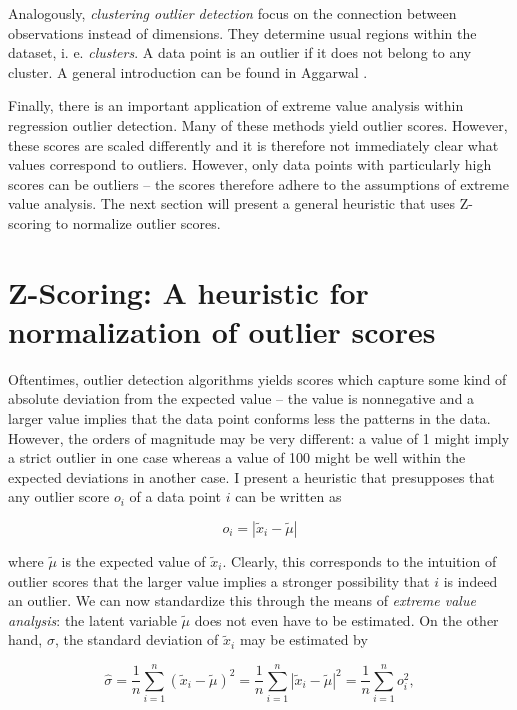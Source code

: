 \documentclass[]{report}
\theoremstyle{definition}
\theoremstyle{definition}
\theoremstyle{definition}
\theoremstyle{remark}
\begin{document}
Analogously, \emph{clustering outlier detection} focus on the connection
between observations instead of dimensions. They determine usual regions
within the dataset, i. e. \emph{clusters}. A data point is an outlier if
it does not belong to any cluster. A general introduction can be found
in Aggarwal \citeyearpar[ch.~4]{Aggarwal2017}.

Finally, there is an important application of extreme value analysis
within regression outlier detection. Many of these methods yield outlier
scores. However, these scores are scaled differently and it is therefore
not immediately clear what values correspond to outliers. However, only
data points with particularly high scores can be outliers -- the scores
therefore adhere to the assumptions of extreme value analysis. The next
section will present a general heuristic that uses Z-scoring to
normalize outlier scores.

\hypertarget{z-scoring-a-heuristic-for-normalization-of-outlier-scores}{%
\section{Z-Scoring: A heuristic for normalization of outlier
scores}\label{z-scoring-a-heuristic-for-normalization-of-outlier-scores}}

Oftentimes, outlier detection algorithms yields scores which capture
some kind of absolute deviation from the expected value -- the value is
nonnegative and a larger value implies that the data point conforms less
the patterns in the data. However, the orders of magnitude may be very
different: a value of 1 might imply a strict outlier in one case whereas
a value of 100 might be well within the expected deviations in another
case. I present a heuristic that presupposes that any outlier score
\(o_i\) of a data point \(i\) can be written as

\[
o_i=|\tilde{x}_i-\tilde{\mu}|
\]

where \(\tilde{\mu}\) is the expected value of \(\tilde{x}_i\). Clearly,
this corresponds to the intuition of outlier scores that the larger
value implies a stronger possibility that \(i\) is indeed an outlier. We
can now standardize this through the means of \emph{extreme value
analysis}: the latent variable \(\tilde{\mu}\) does not even have to be
estimated. On the other hand, \(\sigma\), the standard deviation of
\(\tilde{x}_i\) may be estimated by

\[
\hat{\sigma}=
\frac{1}{n}\sum_{i=1}^n(\tilde{x}_i-\tilde{\mu})^2=
\frac{1}{n}\sum_{i=1}^n|\tilde{x}_i-\tilde{\mu}|^2=
\frac{1}{n}\sum_{i=1}^no_i^2,
\]
\end{document}
